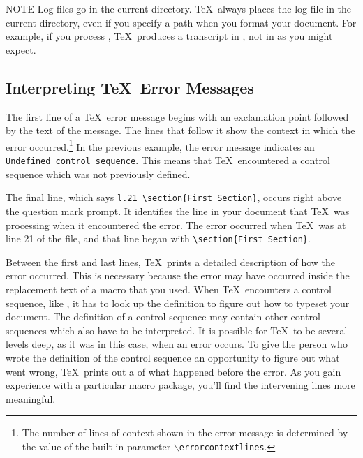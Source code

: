 \begin{note}{NOTE}
Log files go in the current directory.
\TeX\ always places the log file in the current directory, even if
you specify a path when you format your document.  
For example,
if you process , \TeX\ produces a
transcript in , not in 
as you might expect.
\end{note}

\subsection{Interpreting \protect\TeX\ Error Messages}

The first line of a \TeX\ error message begins with an exclamation
point followed by the text of the 
message.  The lines that
follow it show the context in which the error occurred.\footnote{The number 
of lines of context shown in the error message is determined by the value of the
built-in parameter $\backslash$\texttt{errorcontextlines}.}  In
the previous example, the error message indicates an
\verb|Undefined control sequence|.  This means that \TeX\
encountered a control sequence which was not previously defined.

The final line, which says \verb|l.21 \section{First Section}|, occurs right above the question mark prompt.  
It identifies the line in your document that \TeX\
was processing when it encountered the error.  The error occurred when \TeX\
was at line 21 of the file, and that line began with 
\verb|\section{First Section}|.

Between the first and last lines, \TeX\ prints a detailed description
of how the error occurred.  This is necessary because the error may have
occurred inside the replacement text of a macro that you used.  When
\TeX\ encounters a control sequence, like \cs{section}, it has to
look up the definition to figure out how to
typeset your document.  The definition of a control sequence may
contain other control sequences which also have to be interpreted.  It
is possible for \TeX\ to be several levels deep, as it was in this
case, when an error occurs.  To give the person who wrote the
definition of the control sequence an opportunity to figure out what
went wrong, \TeX\ prints out a  of what happened
before the error.  As you gain experience with a particular macro
package, you'll find the intervening lines more
meaningful.

